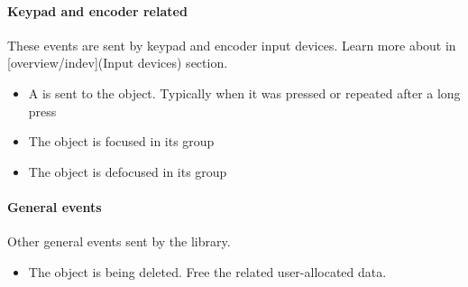 \documentclass[letterpaper,10pt,english]{sphinxmanual}
\begin{document}
\paragraph{Keypad and encoder related}
\label{\detokenize{overview/events:keypad-and-encoder-related}}
These events are sent by keypad and encoder input devices. Learn more about  in {[}overview/indev{]}(Input devices) section.
\begin{itemize}
\item {} 
 A  is sent to the object. Typically when it was pressed or repeated after a long press

\item {} 
 The object is focused in its group

\item {} 
 The object is defocused in its group

\end{itemize}


\paragraph{General events}
\label{\detokenize{overview/events:general-events}}
Other general events sent by the library.
\begin{itemize}
\item {} 
 The object is being deleted. Free the related user-allocated data.

\end{itemize}
\end{document}
